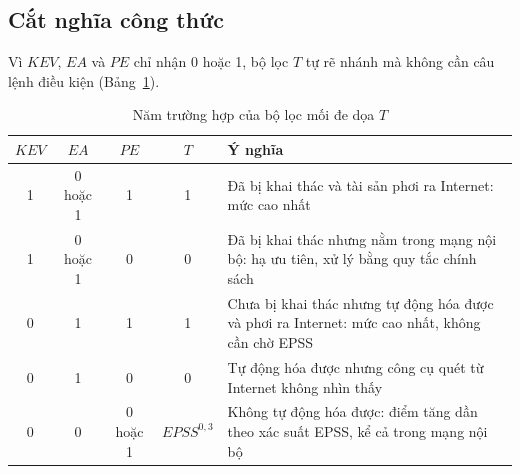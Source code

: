 \documentclass[runningheads]{llncs}
\begin{document}
\subsection{Cắt nghĩa công thức}

Vì $\mathit{KEV}$, $\mathit{EA}$ và $\mathit{PE}$ chỉ nhận 0 hoặc 1, bộ lọc $T$ tự rẽ nhánh mà không cần
câu lệnh điều kiện (Bảng~\ref{tab:nhanh}).

\begin{table}
\centering
\caption{Năm trường hợp của bộ lọc mối đe dọa $T$}\label{tab:nhanh}
\small
\begin{tabular}{cccc>{\raggedright\arraybackslash}p{7.0cm}}
\toprule
$\mathit{KEV}$ & $\mathit{EA}$ & $\mathit{PE}$ & $T$ & Ý nghĩa \\
\midrule
1 & 0 hoặc 1 & 1 & 1 & Đã bị khai thác và tài sản phơi ra Internet: mức cao nhất \\
1 & 0 hoặc 1 & 0 & 0 & Đã bị khai thác nhưng nằm trong mạng nội bộ: hạ ưu tiên, xử lý bằng quy tắc chính sách \\
0 & 1 & 1 & 1 & Chưa bị khai thác nhưng tự động hóa được và phơi ra Internet: mức cao nhất, không cần chờ EPSS \\
0 & 1 & 0 & 0 & Tự động hóa được nhưng công cụ quét từ Internet không nhìn thấy \\
0 & 0 & 0 hoặc 1 & $\mathit{EPSS}^{0{,}3}$ & Không tự động hóa được: điểm tăng dần theo xác suất EPSS, kể cả trong mạng nội bộ \\
\bottomrule
\end{tabular}
\end{table}
\end{document}
